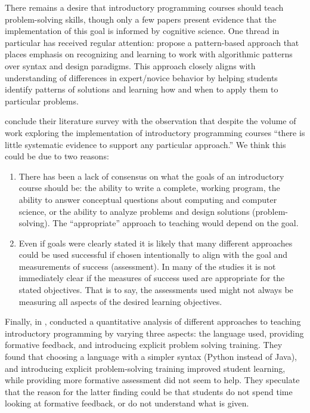 \documentclass[12pt]{article}
\begin{document}
There remains a desire that introductory programming courses should
teach problem-solving skills, though only a few papers present
evidence that the implementation of this goal is informed by cognitive
science\autocite{kramarski_cognitivemetacognitive_1997,reed_incorporating_1998,muller_supporting_2008}. One
thread in particular has received regular attention:
\citeauthor{east_patternbased_1996} propose a pattern-based approach
that places emphasis on recognizing and learning to work with
algorithmic patterns over syntax and design
paradigms\autocite{east_patternbased_1996}. This approach closely
aligns with understanding of differences in expert/novice behavior by
helping students identify patterns of solutions and learning how and
when to apply them to particular
problems\autocite{east_patternbased_1996,muller_pattern_2005,wallingford_first_1996}.

\citeauthor{pears_survey_2007-1} conclude their
\citeyear{pears_survey_2007-1} literature survey with the observation
that despite the volume of work exploring the implementation of
introductory programming courses “there is little systematic evidence
to support any particular approach.”\autocite{pears_survey_2007-1}
We think this could be due to two reasons:

\begin{enumerate}
\item There has been a lack of consensus on what the goals of an
  introductory course should be: the ability to write a complete,
  working program, the ability to answer conceptual questions about
  computing and computer science, or the ability to analyze problems
  and design solutions (problem-solving). The “appropriate” approach
  to teaching would depend on the goal.

\item Even if goals were clearly stated it is likely that many
  different approaches could be used successful if chosen
  intentionally to align with the goal and measurements of success
  (assessment). In many of the studies it is not immediately clear if
  the measures of success used are appropriate for the stated
  objectives. That is to say, the assessments used might not always be
  measuring all aspects of the desired learning objectives.
\end{enumerate}

Finally, in \citeyear{koulouri_teaching_2014},
\citeauthor{koulouri_teaching_2014} conducted a quantitative analysis
of different approaches to teaching introductory programming by
varying three aspects: the language used, providing formative
feedback, and introducing explicit problem solving
training\autocite{koulouri_teaching_2014}. They found that choosing a
language with a simpler syntax (Python instead of Java), and
introducing explicit problem-solving training improved student
learning, while providing more formative assessment did not seem to
help. They speculate that the reason for the latter finding could be
that students do not spend time looking at formative feedback, or do
not understand what is given.
\end{document}
